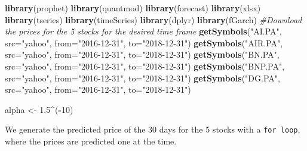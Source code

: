 \documentclass[
  11pt,
]{article}
\newenvironment{Shaded}{\begin{snugshade}}{\end{snugshade}}
\newcommand{\CommentTok}[1]{\textcolor[rgb]{0.56,0.35,0.01}{\textit{#1}}}
\newcommand{\DataTypeTok}[1]{\textcolor[rgb]{0.13,0.29,0.53}{#1}}
\newcommand{\DecValTok}[1]{\textcolor[rgb]{0.00,0.00,0.81}{#1}}
\newcommand{\FloatTok}[1]{\textcolor[rgb]{0.00,0.00,0.81}{#1}}
\newcommand{\KeywordTok}[1]{\textcolor[rgb]{0.13,0.29,0.53}{\textbf{#1}}}
\newcommand{\NormalTok}[1]{#1}
\newcommand{\OperatorTok}[1]{\textcolor[rgb]{0.81,0.36,0.00}{\textbf{#1}}}
\newcommand{\StringTok}[1]{\textcolor[rgb]{0.31,0.60,0.02}{#1}}
\begin{document}
\begin{Shaded}
\begin{Highlighting}[]
\KeywordTok{library}\NormalTok{(prophet)}
\KeywordTok{library}\NormalTok{(quantmod)}
\KeywordTok{library}\NormalTok{(forecast)}
\KeywordTok{library}\NormalTok{(xlsx)}
\KeywordTok{library}\NormalTok{(tseries)}
\KeywordTok{library}\NormalTok{(timeSeries)}
\KeywordTok{library}\NormalTok{(dplyr)}
\KeywordTok{library}\NormalTok{(fGarch)}
\CommentTok{#Download the prices for the 5 stocks for the desired time frame}
\KeywordTok{getSymbols}\NormalTok{(}\StringTok{"AI.PA"}\NormalTok{, }\DataTypeTok{src=}\StringTok{"yahoo"}\NormalTok{, }\DataTypeTok{from=}\StringTok{"2016-12-31"}\NormalTok{, }\DataTypeTok{to=}\StringTok{"2018-12-31"}\NormalTok{)}
\KeywordTok{getSymbols}\NormalTok{(}\StringTok{"AIR.PA"}\NormalTok{, }\DataTypeTok{src=}\StringTok{"yahoo"}\NormalTok{, }\DataTypeTok{from=}\StringTok{"2016-12-31"}\NormalTok{, }\DataTypeTok{to=}\StringTok{"2018-12-31"}\NormalTok{)}
\KeywordTok{getSymbols}\NormalTok{(}\StringTok{"BN.PA"}\NormalTok{, }\DataTypeTok{src=}\StringTok{"yahoo"}\NormalTok{, }\DataTypeTok{from=}\StringTok{"2016-12-31"}\NormalTok{, }\DataTypeTok{to=}\StringTok{"2018-12-31"}\NormalTok{)}
\KeywordTok{getSymbols}\NormalTok{(}\StringTok{"BNP.PA"}\NormalTok{, }\DataTypeTok{src=}\StringTok{"yahoo"}\NormalTok{, }\DataTypeTok{from=}\StringTok{"2016-12-31"}\NormalTok{, }\DataTypeTok{to=}\StringTok{"2018-12-31"}\NormalTok{)}
\KeywordTok{getSymbols}\NormalTok{(}\StringTok{"DG.PA"}\NormalTok{, }\DataTypeTok{src=}\StringTok{"yahoo"}\NormalTok{, }\DataTypeTok{from=}\StringTok{"2016-12-31"}\NormalTok{, }\DataTypeTok{to=}\StringTok{"2018-12-31"}\NormalTok{)}

\NormalTok{alpha <-}\StringTok{ }\FloatTok{1.5}\OperatorTok{^}\NormalTok{(}\OperatorTok{-}\DecValTok{10}\NormalTok{)}
\end{Highlighting}
\end{Shaded}

We generate the predicted price of the 30 days for the 5 stocks with a
\texttt{for\ loop}, where the prices are predicted one at the time.
\end{document}
